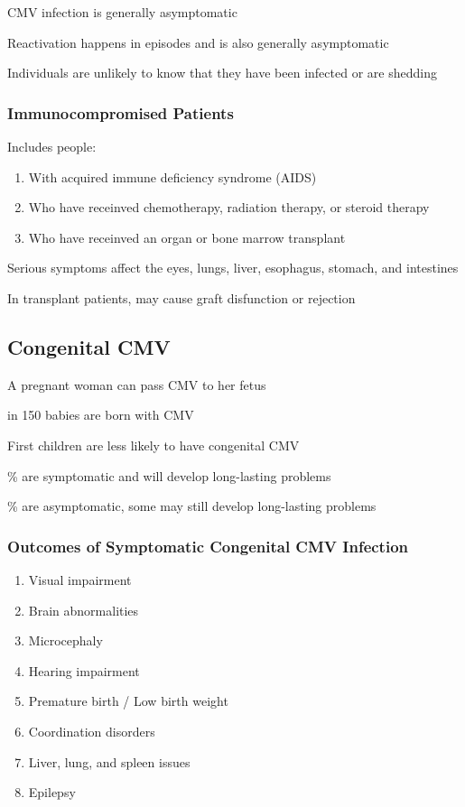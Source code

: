 \documentclass{notes}
\begin{document}
CMV infection is generally asymptomatic

\tab Reactivation happens in episodes and is also generally asymptomatic

\tab \indicates Individuals are unlikely to know that they have been infected or are shedding

\subsubsection{Immunocompromised Patients}

Includes people:

\begin{enumerate}
    \item With acquired immune deficiency syndrome (AIDS)
    \item Who have receinved chemotherapy, radiation therapy, or steroid therapy
    \item Who have receinved an organ or bone marrow transplant
\end{enumerate}

Serious symptoms affect the eyes, lungs, liver, esophagus, stomach, and intestines

In transplant patients, may cause graft disfunction or rejection

\subsection{Congenital CMV}


A pregnant woman can pass CMV to her fetus

 in 150 babies are born with CMV

\tab \tab First children are less likely to have congenital CMV

\% are symptomatic and will develop long-lasting problems

\% are asymptomatic, some may still develop long-lasting problems

\subsubsection{Outcomes of Symptomatic Congenital CMV Infection}

\begin{enumerate}
    \item Visual impairment
    \item Brain abnormalities
    \item Microcephaly
    \item Hearing impairment
    \item Premature birth / Low birth weight
    \item Coordination disorders
    \item Liver, lung, and spleen issues
    \item Epilepsy
\end{enumerate}
\end{document}
